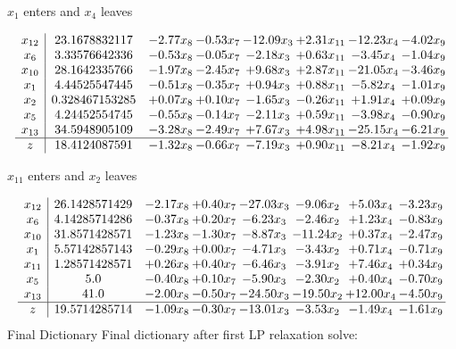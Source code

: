 \documentclass[8pt]{article}
\begin{document}
 $ x_{1} $ enters and $ x_{4} $ leaves 

 \[\begin{array}{c| c c@{\hskip 2pt} c@{\hskip 2pt} c@{\hskip 2pt} c@{\hskip 2pt} c@{\hskip 2pt} c@{\hskip 2pt} }
 x_{12}   &  23.1678832117 & -2.77 x_{8} & -0.53 x_{7} & -12.09 x_{3} & +  2.31 x_{11} & -12.23 x_{4} & -4.02 x_{9}\\
 x_{6}   &  3.33576642336 & -0.53 x_{8} & -0.05 x_{7} & -2.18 x_{3} & +  0.63 x_{11} & -3.45 x_{4} & -1.04 x_{9}\\
 x_{10}   &  28.1642335766 & -1.97 x_{8} & -2.45 x_{7} & +  9.68 x_{3} & +  2.87 x_{11} & -21.05 x_{4} & -3.46 x_{9}\\
 x_{1}   &  4.44525547445 & -0.51 x_{8} & -0.35 x_{7} & +  0.94 x_{3} & +  0.88 x_{11} & -5.82 x_{4} & -1.01 x_{9}\\
 x_{2}   &  0.328467153285 & +  0.07 x_{8} & +  0.10 x_{7} & -1.65 x_{3} & -0.26 x_{11} & +  1.91 x_{4} & +  0.09 x_{9}\\
 x_{5}   &  4.24452554745 & -0.55 x_{8} & -0.14 x_{7} & -2.11 x_{3} & +  0.59 x_{11} & -3.98 x_{4} & -0.90 x_{9}\\
 x_{13}   &  34.5948905109 & -3.28 x_{8} & -2.49 x_{7} & +  7.67 x_{3} & +  4.98 x_{11} & -25.15 x_{4} & -6.21 x_{9}\\
\hline
z    &  18.4124087591 & -1.32 x_{8} & -0.66 x_{7} & -7.19 x_{3} & +  0.90 x_{11} & -8.21 x_{4} & -1.92 x_{9}\\
\end{array}\]


 $ x_{11} $ enters and $ x_{2} $ leaves 

 \[\begin{array}{c| c c@{\hskip 2pt} c@{\hskip 2pt} c@{\hskip 2pt} c@{\hskip 2pt} c@{\hskip 2pt} c@{\hskip 2pt} }
 x_{12}   &  26.1428571429 & -2.17 x_{8} & +  0.40 x_{7} & -27.03 x_{3} & -9.06 x_{2} & +  5.03 x_{4} & -3.23 x_{9}\\
 x_{6}   &  4.14285714286 & -0.37 x_{8} & +  0.20 x_{7} & -6.23 x_{3} & -2.46 x_{2} & +  1.23 x_{4} & -0.83 x_{9}\\
 x_{10}   &  31.8571428571 & -1.23 x_{8} & -1.30 x_{7} & -8.87 x_{3} & -11.24 x_{2} & +  0.37 x_{4} & -2.47 x_{9}\\
 x_{1}   &  5.57142857143 & -0.29 x_{8} & +  0.00 x_{7} & -4.71 x_{3} & -3.43 x_{2} & +  0.71 x_{4} & -0.71 x_{9}\\
 x_{11}   &  1.28571428571 & +  0.26 x_{8} & +  0.40 x_{7} & -6.46 x_{3} & -3.91 x_{2} & +  7.46 x_{4} & +  0.34 x_{9}\\
 x_{5}   &  5.0 & -0.40 x_{8} & +  0.10 x_{7} & -5.90 x_{3} & -2.30 x_{2} & +  0.40 x_{4} & -0.70 x_{9}\\
 x_{13}   &  41.0 & -2.00 x_{8} & -0.50 x_{7} & -24.50 x_{3} & -19.50 x_{2} & + 12.00 x_{4} & -4.50 x_{9}\\
\hline
z    &  19.5714285714 & -1.09 x_{8} & -0.30 x_{7} & -13.01 x_{3} & -3.53 x_{2} & -1.49 x_{4} & -1.61 x_{9}\\
\end{array}\]
Final Dictionary
Final dictionary after first LP relaxation solve: 
\end{document}

